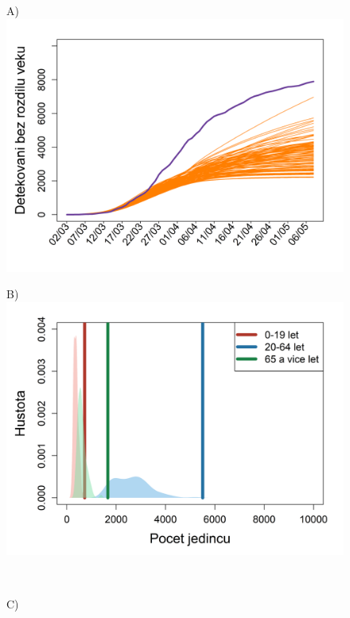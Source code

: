 \begin{figure}
	\begin{center}
		\begin{minipage}[m]{0.45\textwidth}
			A) \\
			\includegraphics[width = \textwidth]{pic/sc_switch.png}
		\end{minipage}
		\begin{minipage}[m]{0.45\textwidth}
			B) \\
			\includegraphics[width = \textwidth]{pic/sc_switch_PDF.png}
		\end{minipage} \\[1ex]
		\begin{minipage}[m]{0.45\textwidth}
			C) \\

\end{minipage}
\end{center}
\end{figure}
